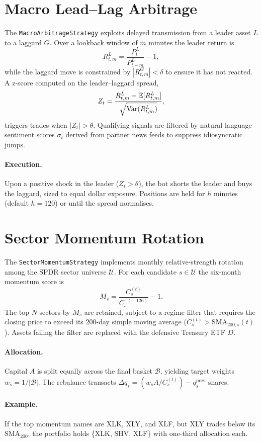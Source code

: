 \section{Macro Lead--Lag Arbitrage}
The \texttt{MacroArbitrageStrategy} exploits delayed transmission from a leader asset $L$ to a laggard $G$. Over a lookback window of $m$ minutes the leader return is
\begin{equation}
R^{L}_{t,m} = \frac{P^L_t}{P^L_{t-m}} - 1,
\end{equation}
while the laggard move is constrained by $|R^{G}_{t,m}| < \delta$ to ensure it has not reacted. A z-score computed on the leader--laggard spread,
\begin{equation}
Z_t = \frac{R^{L}_{t,m} - \mathbb{E}[R^{L}_{t,m}]}{\sqrt{\operatorname{Var}(R^{L}_{t,m})}},
\end{equation}
triggers trades when $|Z_t| > \theta$. Qualifying signals are filtered by natural language sentiment scores $\sigma_t$ derived from partner news feeds to suppress idiosyncratic jumps.

\paragraph{Execution.} Upon a positive shock in the leader ($Z_t>\theta$), the bot shorts the leader and buys the laggard, sized to equal dollar exposure. Positions are held for $h$ minutes (default $h=120$) or until the spread normalises.

\section{Sector Momentum Rotation}
The \texttt{SectorMomentumStrategy} implements monthly relative-strength rotation among the SPDR sector universe $\mathcal{U}$. For each candidate $s \in \mathcal{U}$ the six-month momentum score is
\begin{equation}
M_s = \frac{C_s^{(t)}}{C_s^{(t-126)}} - 1.
\end{equation}
The top $N$ sectors by $M_s$ are retained, subject to a regime filter that requires the closing price to exceed its 200-day simple moving average ($C^{(t)}_s > \text{SMA}_{200,s}(t)$). Assets failing the filter are replaced with the defensive Treasury ETF $D$.

\paragraph{Allocation.} Capital $A$ is split equally across the final basket $\mathcal{B}$, yielding target weights $w_s = 1/|\mathcal{B}|$. The rebalance transacts $\Delta q_s = (w_s A / C_s^{(t)}) - q_s^{\text{prev}}$ shares.

\paragraph{Example.} If the top momentum names are XLK, XLY, and XLF, but XLY trades below its SMA$_{200}$, the portfolio holds \{XLK, SHV, XLF\} with one-third allocation each.
